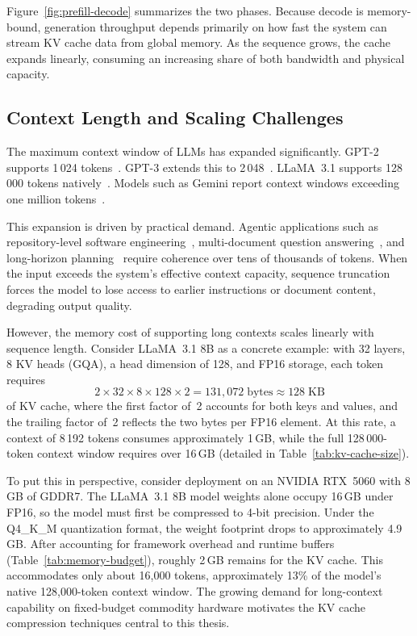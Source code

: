 \documentclass[
english,                 %
bibtex,                  %
]{kththesis}
\numberwithin{listing}{chapter}
\begin{document}
Figure~\ref{fig:prefill-decode} summarizes the two phases. Because decode is memory-bound, generation throughput depends primarily on how fast the system can stream \gls{KV} cache data from global memory. As the sequence grows, the cache expands linearly, consuming an increasing share of both bandwidth and physical capacity.

\subsection{Context Length and Scaling Challenges}
\label{sec:bg-context-scaling}

The maximum context window of \glspl{LLM} has expanded significantly. GPT-2 supports 1\,024 tokens~\cite{radford2019language}. GPT-3 extends this to 2\,048~\cite{brown2020language}. LLaMA~3.1 supports 128\,000 tokens natively~\cite{dubey2024llama3}. Models such as Gemini report context windows exceeding one million tokens~\cite{reid2024gemini}.

This expansion is driven by practical demand. Agentic applications such as repository-level software engineering~\cite{jimenez2024swebench}, multi-document question answering~\cite{liu2024lost}, and long-horizon planning~\cite{wang2023voyager} require coherence over tens of thousands of tokens. When the input exceeds the system's effective context capacity, sequence truncation forces the model to lose access to earlier instructions or document content, degrading output quality.

However, the memory cost of supporting long contexts scales linearly with sequence length. Consider LLaMA~3.1 8B as a concrete example: with 32 layers, 8 \gls{KV} heads (\gls{GQA}), a head dimension of 128, and \gls{FP16} storage, each token requires
%
\begin{equation}
\label{eq:kv-per-token}
2 \times 32 \times 8 \times 128 \times 2 = 131{,}072 \;\text{bytes} \approx 128\;\text{KB}
\end{equation}
%
\noindent of \gls{KV} cache, where the first factor of~2 accounts for both keys and values, and the trailing factor of~2 reflects the two bytes per \gls{FP16} element. At this rate, a context of 8\,192 tokens consumes approximately 1\,GB, while the full 128\,000-token context window requires over 16\,GB (detailed in Table~\ref{tab:kv-cache-size}).

To put this in perspective, consider deployment on an NVIDIA RTX~5060 with 8\,GB of GDDR7. The LLaMA~3.1 8B model weights alone occupy 16\,GB under \gls{FP16}, so the model must first be compressed to 4-bit precision. Under the Q4\_K\_M quantization format, the weight footprint drops to approximately 4.9\,GB. After accounting for framework overhead and runtime buffers (Table~\ref{tab:memory-budget}), roughly 2\,GB remains for the \gls{KV} cache. This accommodates only about 16,000 tokens, approximately 13\% of the model's native 128,000-token context window. The growing demand for long-context capability on fixed-budget commodity hardware motivates the \gls{KV} cache compression techniques central to this thesis.
\end{document}
